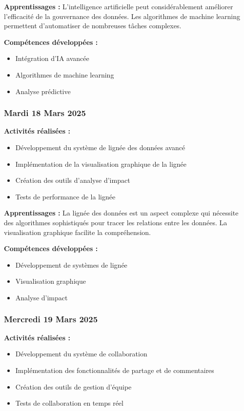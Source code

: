 \documentclass[12pt,a4paper]{article}
\begin{document}
\textbf{Apprentissages :}
L'intelligence artificielle peut considérablement améliorer l'efficacité de la gouvernance des données. Les algorithmes de machine learning permettent d'automatiser de nombreuses tâches complexes.

\textbf{Compétences développées :}
\begin{itemize}
    \item Intégration d'IA avancée
    \item Algorithmes de machine learning
    \item Analyse prédictive
\end{itemize}

\subsubsection{Mardi 18 Mars 2025}
\textbf{Activités réalisées :}
\begin{itemize}
    \item Développement du système de lignée des données avancé
    \item Implémentation de la visualisation graphique de la lignée
    \item Création des outils d'analyse d'impact
    \item Tests de performance de la lignée
\end{itemize}

\textbf{Apprentissages :}
La lignée des données est un aspect complexe qui nécessite des algorithmes sophistiqués pour tracer les relations entre les données. La visualisation graphique facilite la compréhension.

\textbf{Compétences développées :}
\begin{itemize}
    \item Développement de systèmes de lignée
    \item Visualisation graphique
    \item Analyse d'impact
\end{itemize}

\subsubsection{Mercredi 19 Mars 2025}
\textbf{Activités réalisées :}
\begin{itemize}
    \item Développement du système de collaboration
    \item Implémentation des fonctionnalités de partage et de commentaires
    \item Création des outils de gestion d'équipe
    \item Tests de collaboration en temps réel
\end{itemize}
\end{document}
